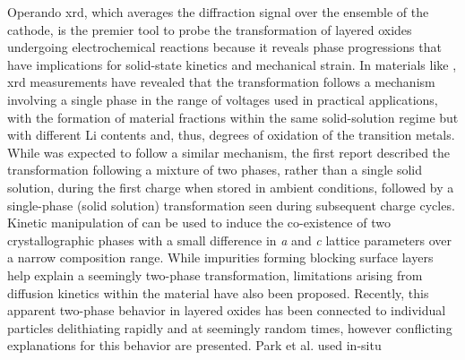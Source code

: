 \documentclass{article}
\begin{document}



Operando \gls{xrd}, which averages the diffraction signal over the
ensemble of the cathode, is the premier tool to probe the
transformation of layered oxides undergoing electrochemical reactions
because it reveals phase progressions that have implications for
solid-state kinetics and mechanical strain.  In \nmc{} materials like
\nmc[333]{}, \gls{xrd} measurements have revealed that the
transformation follows a mechanism involving a single phase in the
range of voltages used in practical
applications,\cite{hulzen2018,ahn2017,zhou2016-2} with the formation
of material fractions within the same solid-solution regime but with
different Li contents and, thus, degrees of oxidation of the
transition metals. While \nca{} was expected to follow a similar
mechanism, the first report described the transformation following a
mixture of two phases, rather than a single solid solution, during the
first charge when stored in ambient conditions, followed by a
single-phase (solid solution) transformation seen during subsequent
charge cycles\cite{robert2015}. Kinetic manipulation of \nmc[333]{}
can be used to induce the co-existence of two crystallographic phases
with a small difference in \emph{a} and \emph{c} lattice parameters
over a narrow composition range\cite{yoon2006,hua2018}. While
impurities forming blocking surface layers help explain a seemingly
two-phase transformation\cite{grenier2017}, limitations arising from
diffusion kinetics within the material have also been
proposed\cite{chapman2020}. Recently, this apparent two-phase behavior
in layered oxides has been connected to individual particles
delithiating rapidly and at seemingly random times\cite{chueh2021,
  zhao2022, rao2021, wang2020-6}, however conflicting explanations for
this behavior are presented. Park et al. \cite{chueh2021} used in-situ
\end{document}
